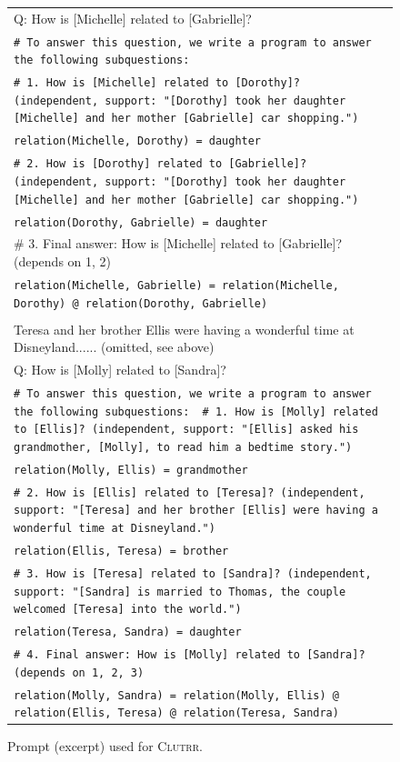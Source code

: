 \documentclass{article}
\theoremstyle{definition}
\newcommand{\clutrr}{\textsc{Clutrr}}
\begin{document}
\begin{figure}[h]
\begin{tabularx}{\linewidth}{X}
Q: How is [Michelle] related to [Gabrielle]? \\
\tt \# To answer this question, we write a program to answer the following subquestions: \\
\tt \# 1. How is [Michelle] related to [Dorothy]? (independent, support: "[Dorothy] took her daughter [Michelle] and her mother [Gabrielle] car shopping.") \\
\tt relation(Michelle, Dorothy) = daughter\\
\tt \# 2. How is [Dorothy] related to [Gabrielle]? (independent, support: "[Dorothy] took her daughter [Michelle] and her mother [Gabrielle] car shopping.") \\
\tt relation(Dorothy, Gabrielle) = daughter \\
\# 3. Final answer: How is [Michelle] related to [Gabrielle]? (depends on 1, 2)\\
\tt relation(Michelle, Gabrielle) = relation(Michelle, Dorothy) @ relation(Dorothy, Gabrielle) \\
\\
Teresa and her brother Ellis were having a wonderful time at Disneyland...... (omitted, see above) \\
Q: How is [Molly] related to [Sandra]? \\
\tt \# To answer this question, we write a program to answer the following subquestions: \
\tt \# 1. How is [Molly] related to [Ellis]? (independent, support: "[Ellis] asked his grandmother, [Molly], to read him a bedtime story.") \\
\tt relation(Molly, Ellis) = grandmother\\
\tt \# 2. How is [Ellis] related to [Teresa]? (independent, support: "[Teresa] and her brother [Ellis] were having a wonderful time at Disneyland.") \\
\tt relation(Ellis, Teresa) = brother\\
\tt \# 3. How is [Teresa] related to [Sandra]? (independent, support: "[Sandra] is married to Thomas, the couple welcomed [Teresa] into the world.")\\
\tt relation(Teresa, Sandra) = daughter \\
\tt \# 4. Final answer: How is [Molly] related to [Sandra]? (depends on 1, 2, 3) \\
\tt relation(Molly, Sandra) = relation(Molly, Ellis) @ relation(Ellis, Teresa) @ relation(Teresa, Sandra) \\
    \bottomrule
    \end{tabularx}
    \caption{Prompt (excerpt) used for \clutrr{}. }
\end{figure}
\end{document}
